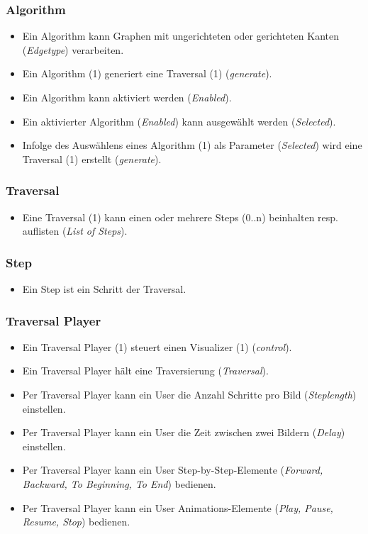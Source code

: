 \subsubsection{Algorithm}
\label{subsubsec:Algorithm}
\begin{itemize}
  \item Ein Algorithm kann Graphen mit ungerichteten oder gerichteten Kanten (\textit{Edgetype}) verarbeiten.
  \item Ein Algorithm (1) generiert eine Traversal (1) (\textit{generate}).
  \item Ein Algorithm kann aktiviert werden (\textit{Enabled}).
  \item Ein aktivierter Algorithm (\textit{Enabled}) kann ausgew\"ahlt werden (\textit{Selected}).
  \item Infolge des Ausw\"ahlens eines Algorithm (1) als Parameter (\textit{Selected}) wird eine Traversal (1) erstellt (\textit{generate}).
\end{itemize}
% 
\subsubsection{Traversal}
\label{subsubsec:Traversal}
\begin{itemize}
  \item Eine Traversal (1) kann einen oder mehrere Steps (0..n) beinhalten resp. auflisten (\textit{List of Steps}).
\end{itemize}

\subsubsection{Step}
\label{subsubsec:Step}
\begin{itemize}
  \item Ein Step ist ein Schritt der Traversal.
\end{itemize}

\subsubsection{Traversal Player}
\label{subsubsec:Traversal Player}
\begin{itemize}
  \item Ein Traversal Player (1) steuert einen Visualizer (1) (\textit{control}).
  \item Ein Traversal Player h\"alt eine Traversierung (\textit{Traversal}).
  \item Per Traversal Player kann ein User die Anzahl Schritte pro Bild (\textit{Steplength}) einstellen.
  \item Per Traversal Player kann ein User die Zeit zwischen zwei Bildern (\textit{Delay}) einstellen.
  \item Per Traversal Player kann ein User Step-by-Step-Elemente (\textit{Forward, Backward, To Beginning, To End}) bedienen.
  \item Per Traversal Player kann ein User Animations-Elemente (\textit{Play, Pause, Resume, Stop}) bedienen.
\end{itemize}

